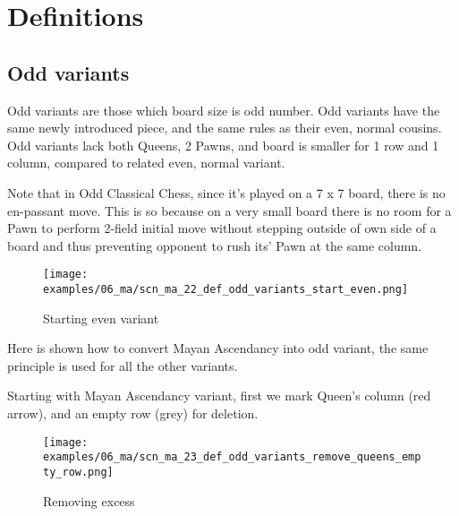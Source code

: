 

\chapter*{Definitions}
\label{ch:Definitions}

\section*{Odd variants}
\label{sec:Definitions/Odd variants}

Odd variants are those which board size is odd number. Odd variants
have the same newly introduced piece, and the same rules as their
even, normal cousins. Odd variants lack both Queens, 2 Pawns, and
board is smaller for 1 row and 1 column, compared to related even,
normal variant.

Note that in Odd Classical Chess, since it's played on a 7 x 7 board,
there is no en-passant move. This is so because on a very small board
there is no room for a Pawn to perform 2-field initial move without
stepping outside of own side of a board and thus preventing opponent
to rush its' Pawn at the same column.

\clearpage %

\noindent
\begin{figure}[!h]
\texttt{[image: examples/06\_ma/scn\_ma\_22\_def\_odd\_variants\_start\_even.png]}
\caption{Starting even variant}
\label{fig:scn_ma_22_def_odd_variants_start_even}
\end{figure}

Here is shown how to convert Mayan Ascendancy into odd variant,
the same principle is used for all the other variants.

Starting with Mayan Ascendancy variant, first we mark Queen's column
(red arrow), and an empty row (grey) for deletion.

\clearpage %

\noindent
\begin{figure}[!h]
\texttt{[image: examples/06\_ma/scn\_ma\_23\_def\_odd\_variants\_remove\_queens\_empty\_row.png]}
\caption{Removing excess}
\label{fig:scn_ma_23_def_odd_variants_remove_queens_empty_row}
\end{figure}


